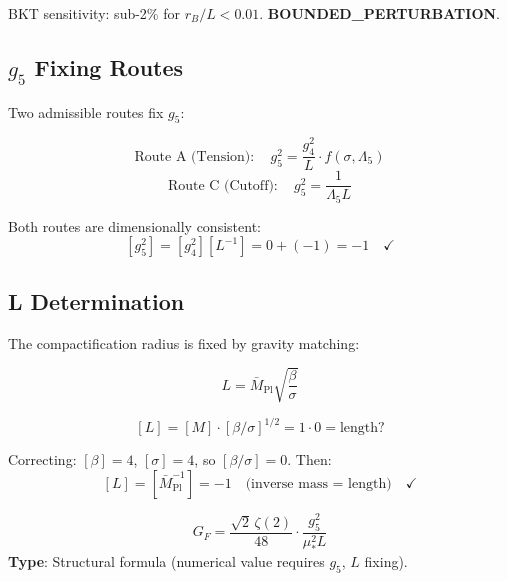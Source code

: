 \documentclass[11pt,a4paper]{article}
\begin{document}
\begin{trapbox}
\label{trap:rt08}
BKT sensitivity: sub-2\% for $r_B/L < 0.01$. \textbf{BOUNDED\_PERTURBATION}.
\end{trapbox}

\subsection{$g_5$ Fixing Routes}
\label{subsec:g5-fixing}

Two admissible routes fix $g_5$:

\begin{equation}
\label{eq:g5-route-A}
\text{Route A (Tension)}: \quad g_5^2 = \frac{g_4^2}{L} \cdot f(\sigma, \Lambda_5)
\end{equation}
\begin{equation}
\label{eq:g5-route-C}
\text{Route C (Cutoff)}: \quad g_5^2 = \frac{1}{\Lambda_5 L}
\end{equation}

Both routes are dimensionally consistent:
\begin{equation}
\label{eq:g5-dim-check}
[g_5^2] = [g_4^2][L^{-1}] = 0 + (-1) = -1 \quad \checkmark
\end{equation}

\subsection{L Determination}
\label{subsec:L-determination}

The compactification radius is fixed by gravity matching:

\begin{equation}
\label{eq:L-from-gravity}
L = \bar{M}_{\text{Pl}} \sqrt{\frac{\beta}{\sigma}}
\end{equation}

\begin{equation}
\label{eq:L-dim-check}
[L] = [M] \cdot [\beta/\sigma]^{1/2} = 1 \cdot 0 = \text{length?}
\end{equation}

Correcting: $[\beta] = 4$, $[\sigma] = 4$, so $[\beta/\sigma] = 0$. Then:
\begin{equation}
\label{eq:L-corrected}
[L] = [\bar{M}_{\text{Pl}}^{-1}] = -1 \quad \text{(inverse mass = length)} \quad \checkmark
\end{equation}

\begin{predictionbox}
\label{box:prediction-gf}
\begin{equation}
\label{eq:gf-prediction}
\boxed{G_F = \frac{\sqrt{2}\,\zeta(2)}{48} \cdot \frac{g_5^2}{\mu_*^2 L}}
\end{equation}
\textbf{Type}: Structural formula (numerical value requires $g_5$, $L$ fixing).
\end{predictionbox}
\end{document}
